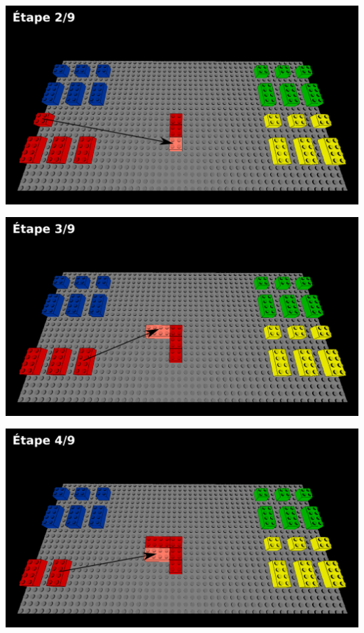 \documentclass[aspectratio=169]{beamer}
\begin{document}
\begin{frame}
  \includegraphics[width=\linewidth]{step2.png}
\end{frame}

\begin{frame}
  \includegraphics[width=\linewidth]{step3.png}
\end{frame}

\begin{frame}
  \includegraphics[width=\linewidth]{step4.png}
\end{frame}
\end{document}
